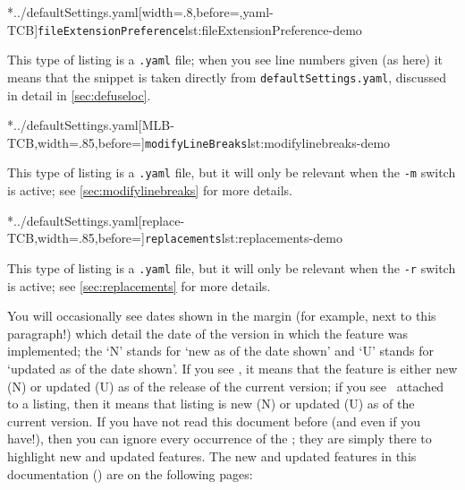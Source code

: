 	\begin{minipage}{.4\textwidth}
		\cmhlistingsfromfile[style=fileExtensionPreference]*{../defaultSettings.yaml}[width=.8\linewidth,before=\centering,yaml-TCB]{\texttt{fileExtensionPreference}}{lst:fileExtensionPreference-demo}
	\end{minipage}%
	\hfill
	\begin{minipage}{.4\textwidth}
		This type of listing is a \texttt{.yaml} file; when you see line numbers given (as here)
		it means that the snippet is taken directly from \texttt{defaultSettings.yaml}, discussed in
		detail in \vref{sec:defuseloc}.
	\end{minipage}%

	\begin{minipage}{.55\textwidth}
		\cmhlistingsfromfile[style=modifylinebreaks]*{../defaultSettings.yaml}[MLB-TCB,width=.85\linewidth,before=\centering]{\texttt{modifyLineBreaks}}{lst:modifylinebreaks-demo}
	\end{minipage}%
	\hfill
	\begin{minipage}{.4\textwidth}
		This type of listing is a \texttt{.yaml} file, but it will only
		be relevant when the \texttt{-m} switch is active; see \vref{sec:modifylinebreaks}
		for more details.
	\end{minipage}%

	\begin{minipage}{.55\textwidth}
		\cmhlistingsfromfile[style=replacements]*{../defaultSettings.yaml}[replace-TCB,width=.85\linewidth,before=\centering]{\texttt{replacements}}{lst:replacements-demo}
	\end{minipage}%
	\hfill
	\begin{minipage}{.4\textwidth}
		This type of listing is a \texttt{.yaml} file, but it will only
		be relevant when the \texttt{-r} switch is active; see \vref{sec:replacements}
		for more details.
	\end{minipage}%

	You will occasionally see dates shown in the margin (for example, next to this
	paragraph!)%
	 which detail the date
	of the version in which the feature was implemented; the `N' stands for `new as of the
	date shown' and `U' stands for `updated as of the date shown'. If you see \stardemo, it
	means that the feature is either new (N) or updated (U) as of the release of the current
	version; if you see \stardemo\, attached to a listing, then it means that listing is new
	(N) or updated (U) as of the current version. If you have not read this document before
	(and even if you have!), then you can ignore every occurrence of the \stardemo; they are
	simply there to highlight new and updated features. The new and updated features in this
	documentation (\gitRel) are on the following pages: \listOfNewFeatures

